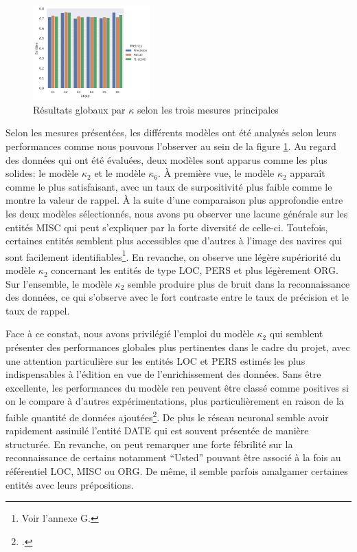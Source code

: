 	\begin{figure}[h!]
	    \centering
	    \includegraphics[width=0.4\textwidth]{annexes/graph/ent_glob.png}
	    \caption{Résultats globaux par $\kappa$ selon les trois mesures principales}
	    \label{fig:ner_global}
	\end{figure}
	
	Selon les mesures présentées, les différents modèles ont été analysés selon leurs performances comme nous pouvons l'observer au sein de la figure \ref{fig:ner_global}. Au regard des données qui ont été évaluées, deux modèles sont apparus comme les plus solides: le modèle $\kappa_2$ et le modèle $\kappa_6$. À première vue, le modèle $\kappa_2$ apparaît comme le plus satisfaisant, avec un taux de surpositivité plus faible comme le montre la valeur de \gls{rappel}.
	À la suite d'une comparaison plus approfondie entre les deux modèles sélectionnés, nous avons pu observer une lacune générale sur les entités MISC qui peut s'expliquer par la forte diversité de celle-ci. Toutefois, certaines entités semblent plus accessibles que d'autres à l'image des navires qui sont facilement identifiables\footnote{Voir l'annexe G.}. En revanche, on observe une légère supériorité du modèle $\kappa_2$ concernant les entités de type LOC, PERS et plus légèrement ORG. Sur l'ensemble, le modèle $\kappa_2$ semble produire plus de bruit dans la reconnaissance des données, ce qui s'observe avec le fort contraste entre le taux de précision et le taux de rappel. 
	
	Face à ce constat, nous avons privilégié l'emploi du modèle $\kappa_2$ qui semblent présenter des performances globales plus pertinentes dans le cadre du projet, avec une attention particulière sur les entités LOC et PERS estimés les plus indispensables à l'édition en vue de l'enrichissement des données. Sans être excellente, les performances du modèle \gls{ren} peuvent être classé comme positives si on le compare à d'autres expérimentations, plus particulièrement en raison de la faible quantité de données ajoutées\footcite[p.~105-109]{scheithauerReconnaissanceEntitesNommees2021}. De plus le réseau neuronal semble avoir rapidement assimilé l'entité DATE qui est souvent présentée de manière structurée. En revanche, on peut remarquer une forte fébrilité sur la reconnaissance de certains notamment \enquote{Usted} pouvant être associé à la fois au référentiel LOC, MISC ou ORG. De même, il semble parfois amalgamer certaines entités avec leurs prépositions.
	
